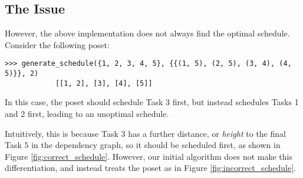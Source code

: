 \documentclass{article}
\begin{document}
\subsection*{The Issue}
    However, the above implementation does not always find the optimal schedule. Consider the following poset:

    \begin{lstlisting}[belowskip=-10pt]
        >>> generate_schedule({1, 2, 3, 4, 5}, {{(1, 5), (2, 5), (3, 4), (4, 5)}}, 2)
            [[1, 2], [3], [4], [5]]
    \end{lstlisting}

    In this case, the poset should schedule Task 3 first, but instead schedules Tasks 1 and 2 first, leading to an unoptimal schedule. 
    
    \vspace{2mm}
    Intuitively, this is because Task 3 has a further distance, or \textit{height} to the final Task $5$ in the dependency graph, so it should be scheduled first, as shown in Figure 
    \ref*{fig:correct_schedule}. However, our initial algorithm does not make this differentiation, and instead treats the poset as in Figure \ref*{fig:incorrect_schedule}.
\end{document}

